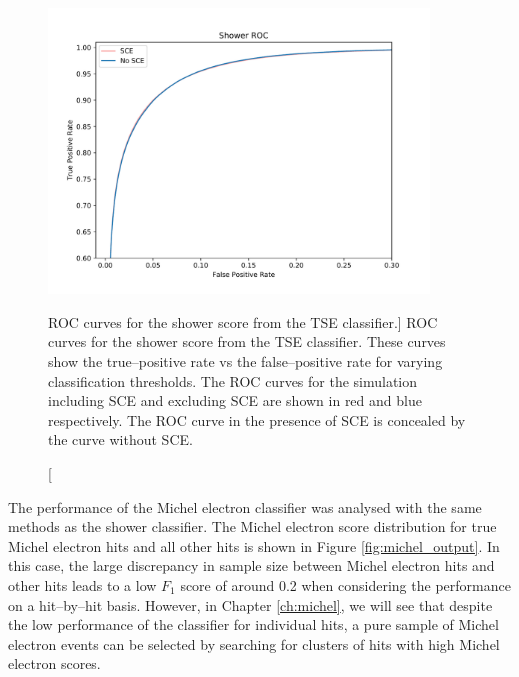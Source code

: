 \begin{figure}
	\centering
	\includegraphics[width=0.9\textwidth]{figures/show_roc_comparison.pdf}
	\caption
	[ROC curves for the shower score from the TSE classifier.]
	{ROC curves for the shower score from the TSE classifier. These curves show
	the true--positive rate vs the false--positive rate for varying classification
	thresholds. The ROC curves for the \protodune{} simulation including SCE and
	excluding SCE are shown in red and blue respectively. The ROC curve in the
	presence of SCE is concealed by the curve without SCE.}
	\label{fig:show_roc}
\end{figure}

The performance of the Michel electron classifier was analysed with the same
methods as the shower classifier. The Michel electron score distribution for
true Michel electron hits and all other hits is shown in Figure
\ref{fig:michel_output}. In this case, the large discrepancy in sample size
between Michel electron hits and other hits leads to a low $F_1$ score of around
0.2 when considering the performance on a hit--by--hit basis. However, in
Chapter \ref{ch:michel}, we will see that despite the low performance of the
classifier for individual hits, a pure sample of Michel electron events can be
selected by searching for clusters of hits with high Michel electron scores.

